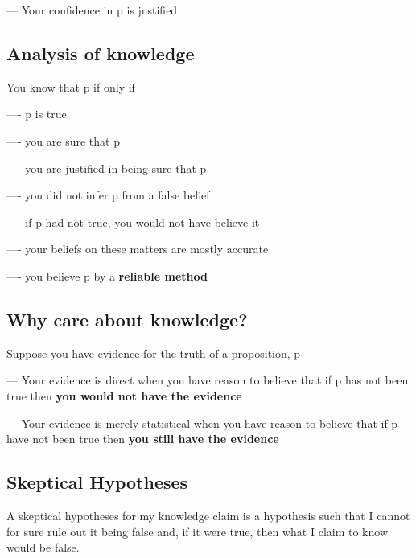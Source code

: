 \documentclass{book}
\begin{document}
--- Your confidence in p is justified.

\subsection{Analysis of knowledge}
 You know that p if only if
 
 ---- p is true
 
 ---- you are sure that p
 
 ---- you are justified in being sure that p
 
 ---- you did not infer p from a false belief
 
 ---- if p had not true, you would not have believe it
 
 ---- your beliefs on these matters are mostly accurate
 
 ---- you believe p by a \textbf{reliable method}
 
 \subsection {Why care about knowledge?}
 
 Suppose you have evidence for the truth of a proposition, p
 
 --- Your evidence is direct when you have reason to believe that if p has not been true then \textbf{you would not have the evidence}
 
 --- Your evidence is merely statistical when you have reason to believe that if p have not been true then \textbf{you still have the evidence}
 
 \subsection{Skeptical Hypotheses}
 A skeptical hypotheses for my knowledge claim is a hypothesis such that I cannot for sure rule out it being false and, if it were true, then what I claim to know would be false.
 
   
 
\end{document}
